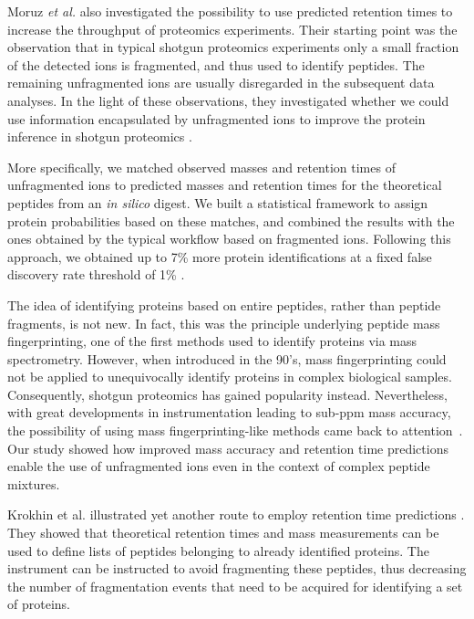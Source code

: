 \documentclass[a4paper]{article}
\begin{document}
Moruz {\em et al.} also investigated the possibility to use predicted
retention times to increase the throughput of proteomics
experiments. Their starting point was the observation that in typical
shotgun proteomics experiments only a small fraction of the detected
ions is fragmented, and thus used to identify peptides. The remaining
unfragmented ions are usually disregarded in the subsequent data
analyses. In the light of these observations, they investigated
whether we could use information encapsulated by unfragmented ions to
improve the protein inference in shotgun proteomics \cite{mf}.



More specifically, we matched observed masses and retention times of
unfragmented ions to predicted masses and retention times for the
theoretical peptides from an {\it in silico} digest. We built a
statistical framework to assign protein probabilities based on these
matches, and combined the results with the ones obtained by the
typical workflow based on fragmented ions. Following this approach, we
obtained up to 7\% more protein identifications at a fixed false
discovery rate threshold of 1\% \cite{mf}.

The idea of identifying proteins based on entire peptides, rather than
peptide fragments, is not new. In fact, this was the principle
underlying peptide mass fingerprinting, one of the first methods used
to identify proteins via mass spectrometry. However, when introduced
in the 90's, mass fingerprinting could not be applied to unequivocally
identify proteins in complex biological samples. Consequently, shotgun
proteomics has gained popularity instead. Nevertheless, with great
developments in instrumentation leading to sub-ppm mass accuracy,
the possibility of using mass fingerprinting-like methods came back to
attention~\cite{iamt1}. Our study showed how improved mass accuracy
and retention time predictions enable the use of unfragmented ions
even in the context of complex peptide mixtures. 

Krokhin et al. illustrated yet another route to employ retention time
predictions \cite{krokhin200612, McQueen2012}. They showed that
theoretical retention times and mass measurements can be used to
define lists of peptides belonging to already identified proteins. The
instrument can be instructed to avoid fragmenting these peptides, thus
decreasing the number of fragmentation events that need to be acquired
for identifying a set of proteins.
\end{document}
